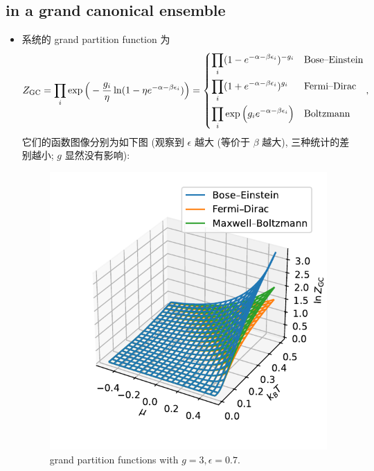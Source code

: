 \subsection{in a grand canonical ensemble}
\begin{itemize}
	\item 系统的 grand partition function 为
	\begin{equation} \label{6.1.10}
		Z_\text{GC} = \prod_i \exp \Big( - \frac{g_i}{\eta} \ln(1 - \eta e^{- \alpha - \beta \epsilon_i}) \Big) = \begin{dcases}
			\prod_i (1 - e^{- \alpha - \beta \epsilon_i})^{- g_i} & \text{Bose--Einstein} \\
			\prod_i (1 + e^{- \alpha - \beta \epsilon_i})^{g_i} & \text{Fermi--Dirac} \\
			\prod_i \exp \Big( g_i e^{- \alpha - \beta \epsilon_i} \Big) & \text{Boltzmann}
		\end{dcases},
	\end{equation}
	它们的函数图像分别为如下图 (观察到 $\epsilon$ 越大 (等价于 $\beta$ 越大), 三种统计的差别越小; $g$ 显然没有影响):
	
	\begin{figure}[H]
		\centering
		\includegraphics[scale=0.8]{figures/grand partition functions with g = 3, epsilon = 0.7.pdf}
		\caption{grand partition functions with $g = 3, \epsilon = 0.7$.}
	\end{figure}
	

\end{itemize}
